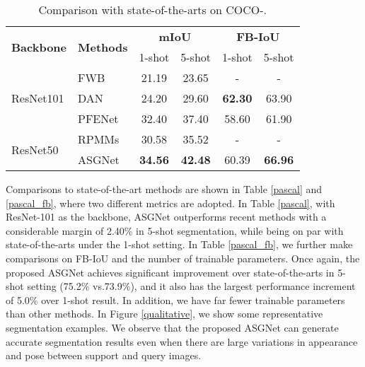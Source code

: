 \begin{table}[htbp]\footnotesize
\begin{center}
\begin{tabular}{|l|l|cc|cc|}
\hline
\multirow{2}{*}{\textbf{Backbone}} & \multirow{2}{*}{\textbf{Methods}} & \multicolumn{2}{c|}{\textbf{mIoU}} & \multicolumn{2}{c|}{\textbf{FB-IoU}} \\ \cline{3-6} 
                                   &                                   & 1-shot               & 5-shot      & 1-shot                & 5-shot       \\ \hline\hline
\multirow{3}{*}{ResNet101}         & FWB \cite{fwb}                              & 21.19                & 23.65       & -                     & -            \\ 
                                   & DAN \cite{danet}                             & 24.20                & 29.60       & \textbf{62.30}        & 63.90        \\ 
                                   & PFENet \cite{pfenet}                             & 32.40                & 37.40       & 58.60        & 61.90        \\ \hline
\multirow{2}{*}{ResNet50}          & RPMMs \cite{pmms}                             & 30.58                & 35.52       & -                     & -            \\ 
                                   & ASGNet                            & \textbf{34.56}       &  \textbf{42.48}           & 60.39                 &  \textbf{66.96}            \\ \hline
\end{tabular}
\end{center}
\caption{Comparison with state-of-the-arts on COCO-.}
\vspace{-5mm}
\label{coco}
\end{table}

\vspace{1mm}
Comparisons to state-of-the-art methods are shown in Table \ref{pascal} and \ref{pascal_fb}, where two different metrics are adopted.
In Table \ref{pascal}, with ResNet-101 as the backbone, ASGNet outperforms recent methods with a considerable margin of 2.40\% in 5-shot segmentation, while being on par with state-of-the-arts under the 1-shot setting.
In Table \ref{pascal_fb}, we further make comparisons on FB-IoU and the number of trainable parameters.
Once again, the proposed ASGNet achieves significant improvement over state-of-the-arts in 5-shot setting (75.2\% vs.73.9\%), and it also has the largest performance increment of 5.0\% over 1-shot result.
In addition, we have far fewer trainable parameters than other methods.
In Figure \ref{qualitative}, we show some representative segmentation examples.
We observe that the proposed ASGNet can generate accurate segmentation results even when there are large variations in appearance and pose between support and query images.


